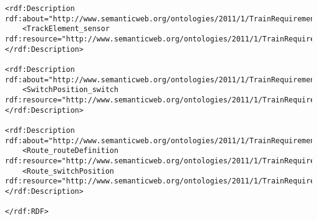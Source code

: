 \begin{lstlisting}[caption=A graph based on the railway system metamodel stored in RDF format]
<rdf:Description rdf:about="http://www.semanticweb.org/ontologies/2011/1/TrainRequirementOntology.owl#3">
	<TrackElement_sensor rdf:resource="http://www.semanticweb.org/ontologies/2011/1/TrainRequirementOntology.owl#1"/>
</rdf:Description>

<rdf:Description rdf:about="http://www.semanticweb.org/ontologies/2011/1/TrainRequirementOntology.owl#4">
	<SwitchPosition_switch rdf:resource="http://www.semanticweb.org/ontologies/2011/1/TrainRequirementOntology.owl#3"/>
</rdf:Description>

<rdf:Description rdf:about="http://www.semanticweb.org/ontologies/2011/1/TrainRequirementOntology.owl#2">
	<Route_routeDefinition rdf:resource="http://www.semanticweb.org/ontologies/2011/1/TrainRequirementOntology.owl#1"/>
	<Route_switchPosition rdf:resource="http://www.semanticweb.org/ontologies/2011/1/TrainRequirementOntology.owl#4"/>
</rdf:Description>

</rdf:RDF>
\end{lstlisting}

